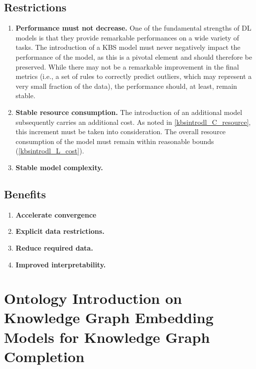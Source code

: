 \subsection{Restrictions}
\begin{enumerate} [start=1,label={\bfseries R\arabic*.}]
    \item \textbf{Performance must not decrease.} One of the fundamental strengths of DL models is that they provide remarkable performances on a wide variety of tasks. The introduction of a KBS model must never negatively impact the performance of the model, as this is a pivotal element and should therefore be preserved. While there may not be a remarkable improvement in the final metrics (i.e., a set of rules to correctly predict outliers, which may represent a very small fraction of the data), the performance should, at least, remain stable.
    
    \item \textbf{Stable resource consumption.} The introduction of an additional model subsequently carries an additional cost. As noted in \ref{kbsintrodl_C_resource}, this increment must be taken into consideration. The overall resource consumption of the model must remain within reasonable bounds (\ref{kbsintrodl_L_cost}). 
    
    \item \textbf{Stable model complexity.} 
\end{enumerate}
\subsection{Benefits}
\begin{enumerate} [start=1,label={\bfseries B\arabic*.}]
    \item \textbf{Accelerate convergence}
    \item \textbf{Explicit data restrictions.}
    \item \textbf{Reduce required data.}
    \item \textbf{Improved interpretability.}
\end{enumerate}

\section{Ontology Introduction on Knowledge Graph Embedding Models for Knowledge Graph Completion} \label{subsec:ontointro_kgc}

